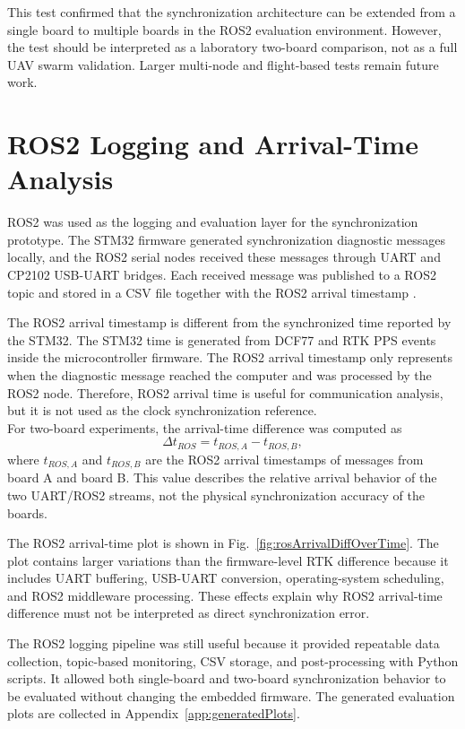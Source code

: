 This test confirmed that the synchronization architecture can be extended from a single board to multiple boards in the ROS2 evaluation environment. However, the test should be interpreted as a laboratory two-board comparison, not as a full UAV swarm validation. Larger multi-node and flight-based tests remain future work.

\section{ROS2 Logging and Arrival-Time Analysis}

ROS2 was used as the logging and evaluation layer for the synchronization prototype. The STM32 firmware generated synchronization diagnostic messages locally, and the ROS2 serial nodes received these messages through UART and CP2102 USB-UART bridges. Each received message was published to a ROS2 topic and stored in a CSV file together with the ROS2 arrival timestamp \cite{ros2Docs}.

The ROS2 arrival timestamp is different from the synchronized time reported by the STM32. The STM32 time is generated from DCF77 and RTK PPS events inside the microcontroller firmware. The ROS2 arrival timestamp only represents when the diagnostic message reached the computer and was processed by the ROS2 node. Therefore, ROS2 arrival time is useful for communication analysis, but it is not used as the clock synchronization reference.
\\
For two-board experiments, the arrival-time difference was computed as
\begin{equation}
\Delta t_{ROS} = t_{ROS,A} - t_{ROS,B},
\end{equation}
where $t_{ROS,A}$ and $t_{ROS,B}$ are the ROS2 arrival timestamps of messages from board A and board B. This value describes the relative arrival behavior of the two UART/ROS2 streams, not the physical synchronization accuracy of the boards.

The ROS2 arrival-time plot is shown in Fig.~\ref{fig:rosArrivalDiffOverTime}. The plot contains larger variations than the firmware-level RTK difference because it includes UART buffering, USB-UART conversion, operating-system scheduling, and ROS2 middleware processing. These effects explain why ROS2 arrival-time difference must not be interpreted as direct synchronization error.

The ROS2 logging pipeline was still useful because it provided repeatable data collection, topic-based monitoring, CSV storage, and post-processing with Python scripts. It allowed both single-board and two-board synchronization behavior to be evaluated without changing the embedded firmware. The generated evaluation plots are collected in Appendix~\ref{app:generatedPlots}.

